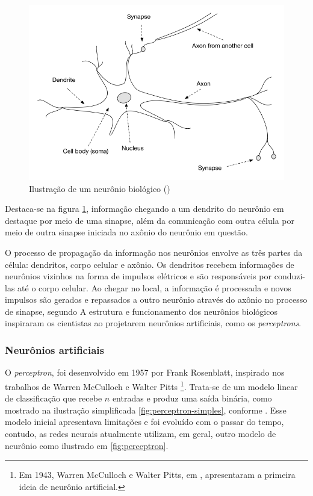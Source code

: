 \begin{figure}[H] 
  \includegraphics[width= 12cm]{../figuras/neuron.png}
  \caption{Ilustração de um neurônio biológico (\cite{dl-oreilly})}
  \label{fig:neuron}
\end{figure}

Destaca-se na figura \ref{fig:neuron}, informação chegando a um 
dendrito do neurônio em destaque
por meio de uma sinapse, além da comunicação com outra célula
por meio de outra sinapse iniciada no axônio 
do neurônio em questão. 

O processo de propagação da informação nos neurônios 
envolve as três partes da célula: dendritos, corpo celular
e axônio.
Os dendritos recebem informações de neurônios vizinhos 
na forma de impulsos elétricos e são responsáveis 
por conduzi-las até o corpo celular. 
Ao chegar no local, a informação é processada e novos 
impulsos são gerados e repassados a outro neurônio 
através do axônio no processo de sinapse, segundo \cite{fund_deep_learning}
A estrutura e funcionamento dos neurônios biológicos inspiraram
os cientistas ao projetarem neurônios artificiais, como 
os \textit{perceptrons}. 

\subsubsection{Neurônios artificiais}

O \textit{perceptron}, foi desenvolvido em 1957 por Frank 
Rosenblatt, inspirado nos trabalhos de Warren McCulloch e Walter Pitts
\footnote{Em 1943, Warren McCulloch e Walter Pitts, em \cite{neuronio}, apresentaram a 
primeira ideia de neurônio artificial.}.
Trata-se de um modelo linear de classificação que 
recebe $n$ entradas e produz uma saída binária, como mostrado 
na ilustração simplificada \ref{fig:perceptron-simples},
conforme \cite{deeplearningbook}.
Esse modelo inicial apresentava limitações e foi evoluído com o passar do 
tempo, contudo, as redes neurais atualmente utilizam, em geral,
outro modelo de neurônio como ilustrado em \ref{fig:perceptron}.


